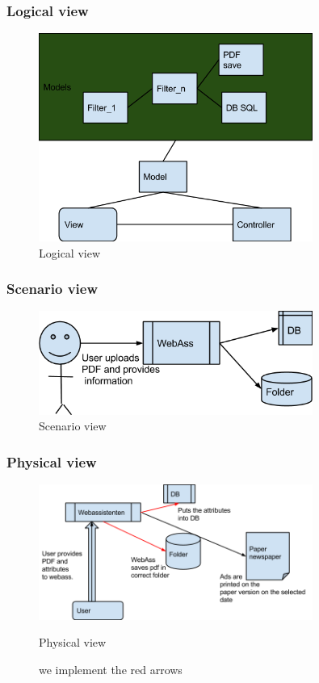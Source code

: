 \subsubsection{Logical view}
\begin{figure}[H]
\centering
\includegraphics[width=0.8\textwidth]{images/architecture00.png}
\caption{Logical view}
\label{fig:logical_view}
\end{figure}
\newpage

\subsubsection{Scenario view}
\begin{figure}[H]
\centering
\includegraphics[width=0.8\textwidth]{images/architecture01.png}
\caption{Scenario view}
\label{fig:scenario_view}
\end{figure}




\subsubsection{Physical view}
\begin{figure}[H]
\centering
\includegraphics[width=0.8\textwidth]{images/architecture02.png}
\caption{Physical view}
\caption*{we implement the red arrows}
\label{fig:physical_view}
\end{figure}
\newpage
